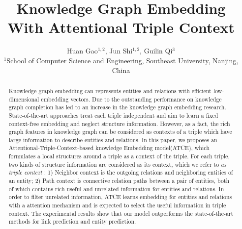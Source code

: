 \documentclass{article}
\title{Knowledge Graph Embedding With Attentional Triple Context}
\author{Huan Gao$^{1,2}$, Jun Shi$^{1,2}$, Guilin Qi$^{3}$\\
$^{1}$School of Computer Science and Engineering,
Southeast University, Nanjing, China  \\
}
\begin{document}
\maketitle

\begin{abstract}
    Knowledge graph embedding can represents entities and relations with efficient low-dimensional embedding vectors. Due to the outstanding performance on knowledge graph completion has led to an increase in the knowledge graph embedding research. State-of-the-art approaches treat each triple independent and aim to learn a fixed context-free embedding and neglect structure information. However, as a fact, the rich graph features in knowledge graph can be considered as contexts of a triple which have large information to describe entities and relations. In this paper, we proposes an Attentional-Triple-Context-based knowledge Embedding model(ATCE), which formulates a local structures around a triple as a context of the triple. For each triple, two kinds of structure information are considered as its context, which we refer to \emph{as triple context} : 1) Neighbor context is the outgoing relations and neighboring entities of an entity; 2) Path context is connective relation paths between a pair of entities, both of which contains rich useful and unrelated information for entities and relations. In order to filter unrelated information, ATCE learns embedding for entities and relations with a attention mechanism and is expected to select the useful information in triple context. The experimental results show that our model outperforms the state-of-the-art methods for link prediction and entity prediction.
\end{abstract}












%

\end{document}
